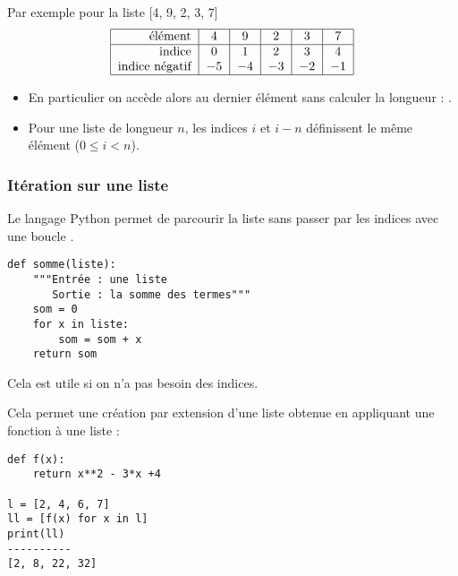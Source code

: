 Par exemple pour la liste {[4, 9, 2, 3, 7]}
\[\begin{tabular}{|r|c|c|c|c|c|}
\hline
élément & 4 & 9 & 2 & 3 & 7 \\
\hline
indice & 0 & 1 & 2 & 3 & 4 \\
indice négatif & $-5$ & $-4$ & $-3$ & $-2$ & $-1$ \\
\hline
\end{tabular}\]
\begin{itemize}
  \item En particulier on accède alors au dernier élément sans calculer la longueur : .
  \item Pour une liste de longueur $n$, les indices $i$ et $i-n$ définissent le même élément ($0 \le i < n$).
\end{itemize}
\subsubsection{Itération sur une liste}
Le langage Python permet de parcourir la liste sans passer par les indices avec une boucle .

\begin{lstlisting}
def somme(liste):
    """Entrée : une liste
       Sortie : la somme des termes"""
    som = 0           
    for x in liste: 
        som = som + x 
    return som
\end{lstlisting}
Cela est utile si on n'a pas besoin des indices.

Cela permet une création par extension d'une liste obtenue en appliquant une fonction à une liste :
\begin{lstlisting}
def f(x):
    return x**2 - 3*x +4

l = [2, 4, 6, 7]
ll = [f(x) for x in l]
print(ll)
----------
[2, 8, 22, 32]
\end{lstlisting}
